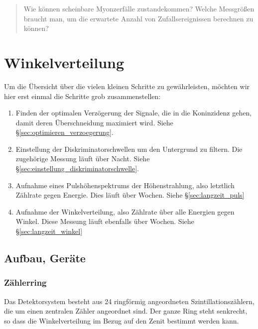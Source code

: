 \documentclass[11pt, ngerman, fleqn, DIV=15, headinclude, BCOR=2cm]{scrreprt}
\begin{document}
\begin{quote}
    Wie können scheinbare Myonzerfälle zustandekommen? Welche Messgrößen
    braucht man, um die erwartete Anzahl von Zufallsereignissen berechnen zu
    können?
\end{quote}


\chapter{Winkelverteilung}

Um die Übersicht über die vielen kleinen Schritte zu gewährleisten, möchten wir
hier erst einmal die Schritte grob zusammenstellen:

\begin{enumerate}
    \item
        Finden der optimalen Verzögerung der Signale, die in die Koninzidenz
        gehen, damit deren Überschneidung maximiert wird. Siehe
        §\ref{sec:optimieren_verzoegerung}.

    \item
        Einstellung der Diskriminatorschwellen um den Untergrund zu filtern.
        Die zugehörige Messung läuft über Nacht. Siehe
        §\ref{sec:einstellung_diskriminatorschwelle}.
        
    \item
        Aufnahme eines Pulshöhenspektrums der Höhenstrahlung, also letztlich
        Zählrate gegen Energie. Dies läuft über Wochen. Siehe
        §\ref{sec:langzeit_puls}

    \item
        Aufnahme der Winkelverteilung, also Zählrate über alle Energien gegen
        Winkel. Diese Messung läuft ebenfalls über Wochen. Siehe
        §\ref{sec:langzeit_winkel}
\end{enumerate}

\section{Aufbau, Geräte}

\subsection{Zählerring}

Das Detektorsystem besteht aus 24 ringförmig angeordneten
Szintillationszählern, die um einen zentralen Zähler angeordnet sind. Der ganze
Ring steht senkrecht, so dass die Winkelverteilung im Bezug auf den Zenit
bestimmt werden kann.
\end{document}
